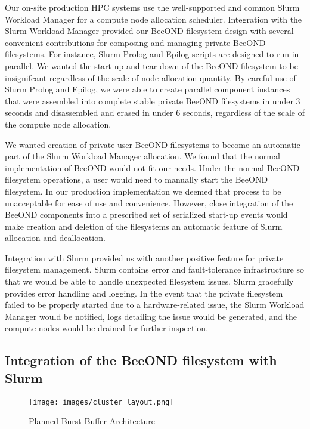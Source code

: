 Our on-site production HPC systems use the well-supported and common Slurm Workload Manager for a compute node allocation scheduler. Integration with the Slurm Workload Manager provided our BeeOND filesystem design with several convenient contributions for composing and managing private BeeOND filesystems.  For instance, Slurm Prolog and Epilog scripts are designed to run in parallel. We wanted the start-up and tear-down of the BeeOND filesystem to be insignifcant regardless of the scale of node allocation quantity. By careful use of Slurm Prolog and Epilog, we were able to create parallel component instances that were assembled into complete stable private BeeOND filesystems in under 3 seconds and disassembled and erased in under 6 seconds, regardless of the scale of the compute node allocation.  

We wanted creation of private user BeeOND filesystems  to become an automatic part of the Slurm Workload Manager allocation. We found that the normal implementation of BeeOND would not fit our needs.  Under the normal BeeOND filesystem operations, a user would need to manually start the BeeOND filesystem.  In our production implementation we deemed that process to be unacceptable for ease of use and convenience.  However, close integration of the BeeOND components into a prescribed set of serialized start-up events would make creation and deletion of the filesystems an automatic feature of Slurm allocation and deallocation. 

Integration with Slurm provided us with another positive feature for private filesystem management.  Slurm contains error and fault-tolerance infrastructure so that we would be able to handle unexpected filesystem issues.  Slurm gracefully provides error handling and logging.  In the event that the private filesystem failed to be properly started due to a hardware-related issue, the Slurm Workload Manager would be notified, logs detailing the issue would be generated, and the compute nodes would be drained for further inspection.

\subsection{Integration of the BeeOND filesystem with Slurm}

\begin{figure}[!htb]
  \centerline{\texttt{[image: images/cluster\_layout.png]}}
  \caption{Planned Burst-Buffer Architecture}
  \label{fig:cluster_layout}
\end{figure}

